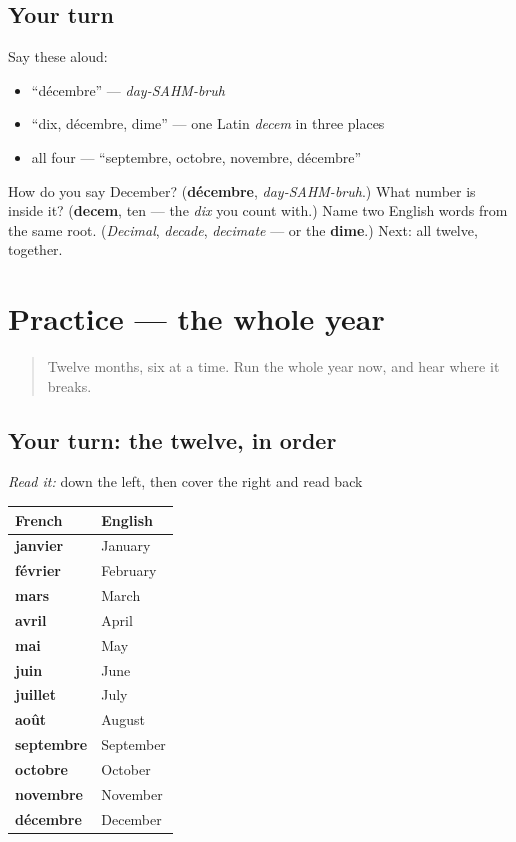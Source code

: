 \subsection*{Your turn}
Say these aloud:

\begin{itemize}
\raggedright
  \item \textquotedblleft{}décembre\textquotedblright{} — \emph{day-SAHM-bruh}
  \item \textquotedblleft{}dix, décembre, dime\textquotedblright{} — one Latin \emph{decem} in three places
  \item all four — \textquotedblleft{}septembre, octobre, novembre, décembre\textquotedblright{}
\end{itemize}

\begin{tcolorbox}[breakable,colback=teal!4,colframe=teal!35!black,title={Before you move on}]
How do you say December? (\textbf{décembre}, \emph{day-SAHM-bruh}.) What number is inside it? (\textbf{decem}, ten — the \emph{dix} you count with.) Name two English words from the same root. (\emph{Decimal}, \emph{decade}, \emph{decimate} — or the \textbf{dime}.) Next: all twelve, together.
\end{tcolorbox}
\section[Practice]{Practice — the whole year}

\label{lesson:FR-C09-mois-practice-2}



\begin{quote}
Twelve months, six at a time. Run the whole year now, and hear where it breaks.
\end{quote}

\subsection*{Your turn: the twelve, in order}
\emph{Read it:} down the left, then cover the right and read back

\noindent
\begin{tabularx}{\linewidth}{@{}>{\raggedright\arraybackslash}X>{\raggedright\arraybackslash}X@{}}
\toprule
\textbf{French} & \textbf{English} \\
\midrule
\textbf{janvier} & January \\
\textbf{février} & February \\
\textbf{mars} & March \\
\textbf{avril} & April \\
\textbf{mai} & May \\
\textbf{juin} & June \\
\textbf{juillet} & July \\
\textbf{août} & August \\
\textbf{septembre} & September \\
\textbf{octobre} & October \\
\textbf{novembre} & November \\
\textbf{décembre} & December \\
\bottomrule
\end{tabularx}

